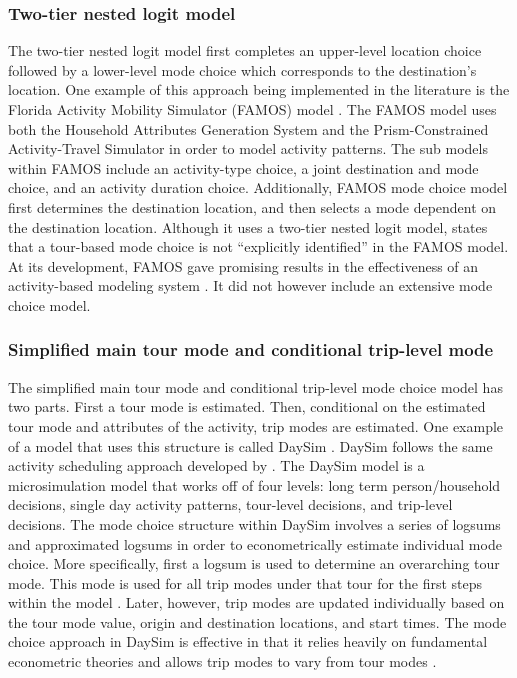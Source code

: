 \documentclass[3p, authoryear, review]{elsarticle} %
\begin{document}
\hypertarget{lit32}{%
\subsubsection{Two-tier nested logit model}\label{lit32}}

The two-tier nested logit model first completes an upper-level location choice followed by a lower-level mode choice which corresponds to the destination's location. One example of this approach being implemented in the literature is the Florida Activity Mobility Simulator (FAMOS) model \citep{pendyala05}. The FAMOS model uses both the Household Attributes Generation System and the Prism-Constrained Activity-Travel Simulator in order to model activity patterns. The sub models within FAMOS include an activity-type choice, a joint destination and mode choice, and an activity duration choice. Additionally, FAMOS mode choice model first determines the destination location, and then selects a mode dependent on the destination location. Although it uses a two-tier nested logit model, \citet{hasnine21} states that a tour-based mode choice is not ``explicitly identified'' in the FAMOS model. At its development, FAMOS gave promising results in the effectiveness of an activity-based modeling system \citep{pendyala05}. It did not however include an extensive mode choice model.

\hypertarget{lit33}{%
\subsubsection{Simplified main tour mode and conditional trip-level mode}\label{lit33}}

The simplified main tour mode and conditional trip-level mode choice model has two parts. First a tour mode is estimated. Then, conditional on the estimated tour mode and attributes of the activity, trip modes are estimated. One example of a model that uses this structure is called DaySim \citep{bowman06}. DaySim follows the same activity scheduling approach developed by \citet{bowman01}. The DaySim model is a microsimulation model that works off of four levels: long term person/household decisions, single day activity patterns, tour-level decisions, and trip-level decisions. The mode choice structure within DaySim involves a series of logsums and approximated logsums in order to econometrically estimate individual mode choice. More specifically, first a logsum is used to determine an overarching tour mode. This mode is used for all trip modes under that tour for the first steps within the model \citep{bowman06}. Later, however, trip modes are updated individually based on the tour mode value, origin and destination locations, and start times. The mode choice approach in DaySim is effective in that it relies heavily on fundamental econometric theories and allows trip modes to vary from tour modes \citep{hasnine21}.
\end{document}
